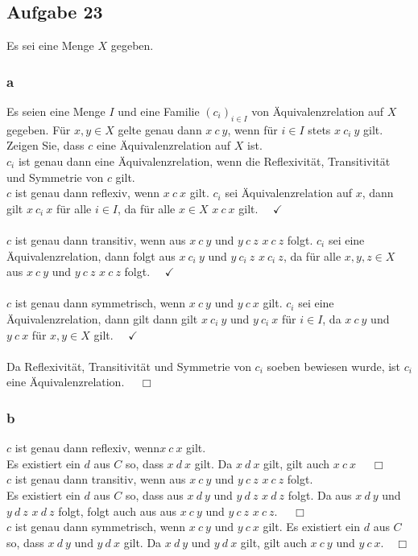 \documentclass[a4paper,graphics,11pt]{article}
\newcommand\aufgabe[1]{\subsection*{Aufgabe #1}}
\newcommand\aufgabenteil[1]{\subsubsection*{#1}}
\begin{document}
%
% 
\aufgabe{23}
Es sei eine Menge $X$ gegeben.
\aufgabenteil{a}
Es seien eine Menge $I$ und eine Familie $(c_{i})_{i \in I}$ von {\"A}quivalenzrelation auf $X$ gegeben. F{\"u}r $x,y \in X$ gelte genau dann $x~c~y$, wenn f{\"u}r $i \in I$ stets $x~c_{i}~y$ gilt. Zeigen Sie, dass $c$ eine {\"A}quivalenzrelation auf $X$ ist.\\
$c_{i}$ ist genau dann eine {\"A}quivalenzrelation, wenn die Reflexivit{\"a}t, Transitivit{\"a}t und Symmetrie von $c$ gilt. \\
$c$ ist genau dann reflexiv, wenn $x~c~x$ gilt. $c_{i}$ sei {\"A}quivalenzrelation auf $x$, dann gilt $x~c_{i}~x$ f{\"u}r alle $i\in I$, da f{\"u}r alle $x \in X$ $x~c~x$ gilt.~~ $\checkmark$ \\ \\
$c$ ist genau dann transitiv, wenn aus $x~c~y$ und $y~c~z$ $x~c~z$ folgt. $c_{i}$ sei eine {\"A}quivalenzrelation, dann folgt aus $x~c_{i}~y$ und $y~c_{i}~z$ $x~c_{i}~z$, da f{\"u}r alle $x,y,z \in X$ aus $x~c~y$ und $y~c~z$ $x~c~z$ folgt. ~~$\checkmark$ \\ \\
$c$ ist genau dann symmetrisch, wenn $x~c~y$ und $y~c~x$ gilt. $c_{i}$ sei eine {\"A}quivalenzrelation, dann gilt dann gilt $x~c_{i}~y$ und $y~c_{i}~x$ f{\"u}r $i \in I$, da $x~c~y$ und $y~c~x$ f{\"u}r $x,y \in X$ gilt. ~~$\checkmark$ \\ \\
Da Reflexivit{\"a}t, Transitivit{\"a}t und Symmetrie von $c_{i}$ soeben bewiesen wurde, ist $c_{i}$ eine {\"A}quivalenzrelation. ~~$\Box$
\aufgabenteil{b}
$c$ ist genau dann reflexiv, wenn$x~c~x$ gilt. \\
Es existiert ein $d$ aus $C$ so, dass $x~d~x$ gilt. Da $x~d~x$ gilt, gilt auch $x~c~x$ ~~$\Box$\\
$c$ ist genau dann transitiv, wenn aus $x~c~y$ und $y~c~z$ $x~c~z$ folgt.\\
Es existiert ein $d$ aus $C$ so, dass aus $x~d~y$ und $y~d~z$ $x~d~z$ folgt. Da aus $x~d~y$ und $y~d~z$ $x~d~z$ folgt, folgt auch aus aus $x~c~y$ und $y~c~z$ $x~c~z$. ~~$\Box$\\
$c$ ist genau dann symmetrisch, wenn $x~c~y$ und $y~c~x$ gilt. Es existiert ein $d$ aus $C$ so, dass $x~d~y$ und $y~d~x$ gilt. Da $x~d~y$ und $y~d~x$ gilt, gilt auch $x~c~y$ und $y~c~x$.~~$\Box$\\
\end{document}
